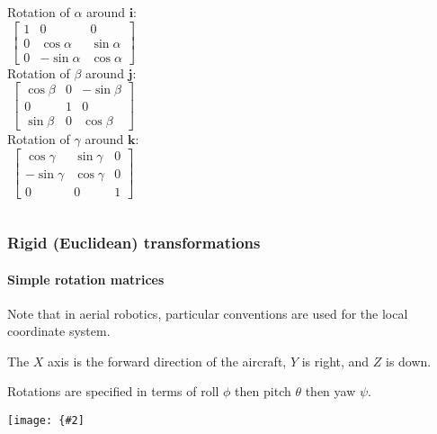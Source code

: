 \documentclass[aspectratio=169]{beamer}
\renewcommand{\vec}[1]{\boldsymbol{#1}}
\newcommand{\myfig}[3]{\centerline{\texttt{[image: \{\#2]}}}
    \centerline{\scriptsize #3}}
\begin{document}
\begin{frame}
\begin{columns}
\column{1.5in}
Rotation of $\alpha$ around $\vec{i}$:
\begin{equation*}
\begin{bmatrix}
1 & 0 & 0 \\
0 & \cos \alpha & \sin \alpha \\
0 & -\sin \alpha & \cos \alpha
\end{bmatrix}
\end{equation*}
\column{1.5in}
Rotation of $\beta$ around $\vec{j}$:
\begin{equation*}
\begin{bmatrix}
\cos \beta & 0 & -\sin \beta \\
0 & 1 & 0 \\
\sin \beta & 0 & \cos \beta
\end{bmatrix}
\end{equation*}
\column{1.5in}
Rotation of $\gamma$ around $\vec{k}$:
\begin{equation*}
\begin{bmatrix}
\cos \gamma & \sin \gamma & 0 \\
-\sin \gamma & \cos \gamma & 0 \\
0 & 0 & 1
\end{bmatrix}
\end{equation*}
\end{columns}
\end{frame}


\begin{frame}
\frametitle{Rigid (Euclidean) transformations}
\framesubtitle{Simple rotation matrices}

Note that in \alert{aerial robotics},
particular conventions are used for the
local coordinate system.

\medskip

The $X$ axis is the forward direction of the aircraft,
$Y$ is right, and $Z$ is down.

\medskip

Rotations are specified in terms of roll $\phi$ then
pitch $\theta$ then yaw $\psi$.

\myfig{2.5in}{Rollpitchyawplain}{\url{http://en.wikipedia.org/wiki/File:Rollpitchyawplain.png}}

\end{frame}
\end{document}
